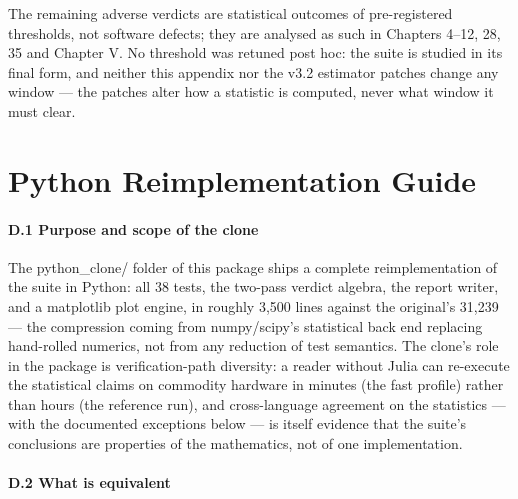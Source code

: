 \documentclass[10pt]{article}
\begin{document}
The remaining adverse verdicts are statistical outcomes of pre-registered thresholds, not software defects; they are analysed as such in Chapters 4--12, 28, 35 and Chapter V. No threshold was retuned post hoc: the suite is studied in its final form, and neither this appendix nor the v3.2 estimator patches change any window --- the patches alter how a statistic is computed, never what window it must clear.

\section{Python Reimplementation Guide}

\paragraph{D.1 Purpose and scope of the clone}

The python\_clone/ folder of this package ships a complete reimplementation of the suite in Python: all 38 tests, the two-pass verdict algebra, the report writer, and a matplotlib plot engine, in roughly 3,500 lines against the original's 31,239 --- the compression coming from numpy/scipy's statistical back end replacing hand-rolled numerics, not from any reduction of test semantics. The clone's role in the package is verification-path diversity: a reader without Julia can re-execute the statistical claims on commodity hardware in minutes (the fast profile) rather than hours (the reference run), and cross-language agreement on the statistics --- with the documented exceptions below --- is itself evidence that the suite's conclusions are properties of the mathematics, not of one implementation.

\paragraph{D.2 What is equivalent}
\end{document}
